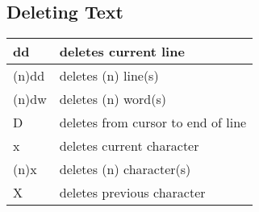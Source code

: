 \documentclass[letterpaper,10pt,english]{sphinxmanual}
\begin{document}
\subsection{Deleting Text}
\label{editor/vi:deleting-text}
\begin{tabulary}{\linewidth}{|L|L|}
\hline

dd
 & 
deletes current line
\\
\hline
(n)dd
 & 
deletes (n) line(s)
\\
\hline
(n)dw
 & 
deletes (n) word(s)
\\
\hline
D
 & 
deletes from cursor to end of line
\\
\hline
x
 & 
deletes current character
\\
\hline
(n)x
 & 
deletes (n) character(s)
\\
\hline
X
 & 
deletes previous character
\\
\hline\end{tabulary}
\end{document}
